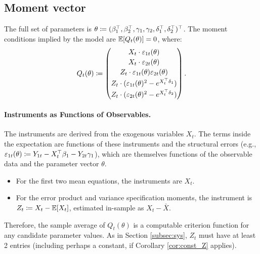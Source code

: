 \subsection{Moment vector}

The full set of parameters is $\theta\coloneqq(\beta_{1}^{\top},\beta_{2}^{\top},\gamma_{1},\gamma_{2},\delta_{1}^{\top},\delta_{2}^{\top})^{\top}$.
The moment conditions implied by the model are $\mathbb{E}[Q_{t}(\theta)]=0$,
where:
\[
Q_{t}(\theta)\coloneqq\begin{pmatrix}
X_{t} \cdot \varepsilon_{1t}(\theta)\\[2pt]
X_{t} \cdot \varepsilon_{2t}(\theta)\\[2pt]
Z_{t} \cdot \varepsilon_{1t}(\theta)\varepsilon_{2t}(\theta)\\[2pt]
Z_{t} \cdot   (\varepsilon_{1t}(\theta)^{2}-e^{X_{t}^{\top}\delta_{1}})\\[2pt]
Z_{t} \cdot   (\varepsilon_{2t}(\theta)^{2}-e^{X_{t}^{\top}\delta_{2}})
\end{pmatrix}.
\]


\paragraph{Instruments as Functions of Observables.}

The instruments are derived from the exogenous variables $X_{t}$.
The terms inside the expectation are functions of these instruments
and the structural errors (e.g., $\varepsilon_{1t}(\theta)\coloneqq Y_{1t}-X_{t}^{\top}\beta_{1}-Y_{2t}\gamma_{1}$),
which are themselves functions of the observable data and the parameter
vector $\theta$.
\begin{itemize}
\item For the first two mean equations, the instruments are $X_{t}$.
\item For the error product and variance specification moments, the instrument
is $Z_{t}\coloneqq X_{t}-\mathbb{E}[X_{t}]$, estimated in-sample as $X_{t}-\bar{X}$.
\end{itemize}
Therefore, the sample average of $Q_{t}(\theta)$ is a computable
criterion function for any candidate parameter values. As in Section \ref{subsec:sys}, $Z_t$
must have at least 2 entries (including perhaps a constant, if Corollary \ref{cor:const_Z} applies).

